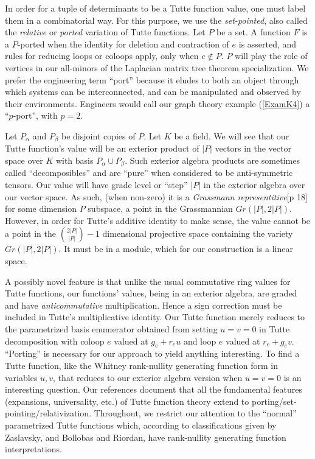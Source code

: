 \documentclass[Unicode]{cedram-alco}
\begin{document}
In order for a tuple of determinants to be a Tutte function value, one
must label them in a combinatorial way.  For this purpose, we use
the \emph{set-pointed}\cite{TPMorphMatI99,TPMorphMatI99},
also called the
\emph{relative}\cite{RelTuttePolyDiaoHetyei} or
\emph{ported}\cite{sdcPorted,TutteEx}
variation of Tutte functions.
Let $P$ be a set.  A function $F$ is a $P$-ported
when the identity for deletion and contraction of $e$ is asserted,
and rules for reducing loops or coloops apply, only when $e \not\in P$.
$P$ will play the role of vertices in our all-minors of the Laplacian
matrix tree theorem specialization.
We prefer the engineering term ``port'' because it eludes to both an object through
which systems can be interconnected,
and can be manipulated and observed by their
environments\cite{Recski,narayanan1997submodular}.
Engineers would call our graph theory example (\ref{ExamK4}) a ``$p$-port'', with $p=2$.

Let $P_{\alpha}$ and $P_{\beta}$ be disjoint copies of $P$.  Let $K$ be a field.
We will see that our Tutte function's value will be an exterior product of
$|P|$ vectors in the vector space over $K$ with basis $P_\alpha \cup P_\beta$.
Such exterior algebra products are sometimes called ``decomposibles''\cite{MarcusFDMuAlPt2}
and are ``pure'' when considered to be anti-symmetric tensors.  Our value will
have grade level or ``step''  $|P|$ in the exterior algebra over our
vector space.
As such, (when non-zero)
it is a \emph{Grassmann representitive}\cite{MarcusFDMuAlPt2}[p 18]
for some
dimension $P$ subspace, a point in the Grassmannian $Gr(|P|,2|P|)$.
However, in order for Tutte's additive identity to make sense, the value cannot be
a point in the $\binom{2|P|}{|P|}-1$ dimensional projective space
containing the variety $Gr(|P|,2|P|)$.  It must be in a module, which for
our construction is a linear space.

A possibly novel feature is that unlike the usual commutative ring values for Tutte
functions, our functions' values, being in an exterior algebra, are graded and have
\emph{anticommutative} multiplication.
Hence a sign correction must be included in Tutte's multiplicative
identity.  Our Tutte function merely reduces to the parametrized
basis enumerator obtained from setting $u=v=0$ in Tutte
decomposition with coloop $e$ valued at $g_e+r_eu$ and loop $e$ valued at $r_e+g_ev$.
``Porting'' is necessary for our approach to yield anything
interesting. To find a Tutte function, like the Whitney rank-nullity
generating function form in variables $u,v$, that reduces to our exterior
algebra version when $u=v=0$ is an interesting question.
Our
references\cite{MR0419272,SetPointedLV,sdcPorted,TutteEx,RelTuttePolyDiaoHetyei}
document that all the fundamental features
(expansions, universality, etc.)
of Tutte function theory extend to porting/set-pointing/relativization.  Throughout,
we restrict our attention to the ``normal'' parametrized Tutte functions which, according
to classifications given by Zaslavsky\cite{MR93a:05047},
and Bollobas and Riordan\cite{BollobasRiordanTuttePolyColored},
have rank-nullity generating function interpretations. 
\end{document}
